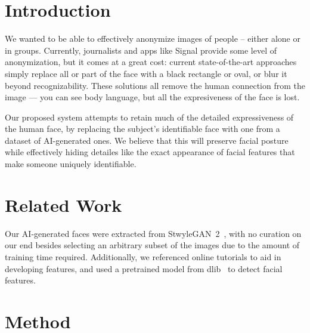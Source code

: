 \section{Introduction}


We wanted to be able to effectively anonymize images of people -- either alone or in groups. Currently, journalists and apps like Signal provide some level of anonymization, but it comes at a great cost: current state-of-the-art approaches simply replace all or part of the face with a black rectangle or oval, or blur it beyond recognizability. These solutions all remove the human connection from the image — you can see body language, but all the expresiveness of the face is lost.

Our proposed system attempts to retain much of the detailed expressiveness of the human face, by replacing the subject's identifiable face with one from a dataset of AI-generated ones. We believe that this will preserve facial posture while effectively hiding detailes like the exact appearance of facial features that make someone uniquely identifiable.

\section{Related Work}


Our AI-generated faces were extracted from StwyleGAN~2~\cite{Karras2019stylegan2}, with no curation on our end besides selecting an arbitrary subset of the images due to the amount of training time required. Additionally, we referenced online tutorials \cite{serengil_2021} to aid in developing features, and used a pretrained model from dlib~\cite{guoquanhao_2019} to detect facial features.

\section{Method}

